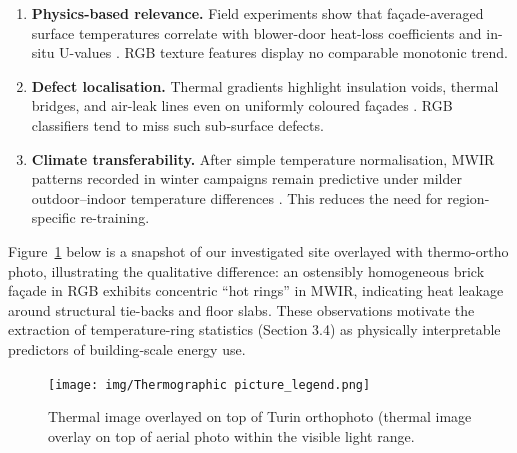 \documentclass[preprint,12pt]{elsarticle}
\begin{document}
    \begin{enumerate}%
      \item \textbf{Physics-based relevance.} Field experiments show that façade-averaged surface temperatures correlate with blower-door heat-loss coefficients and in-situ U-values \cite{Bach2020_BerlinRoofs,Rakha2015_Heliotrope}.  RGB texture features display no comparable monotonic trend.
      \item \textbf{Defect localisation.} Thermal gradients highlight insulation voids, thermal bridges, and air-leak lines even on uniformly coloured façades \cite{Soar2022_IREUI}.  RGB classifiers tend to miss such sub-surface defects.
      \item \textbf{Climate transferability.} After simple temperature normalisation, MWIR patterns recorded in winter campaigns remain predictive under milder outdoor–indoor temperature differences \cite{Maldaner2023_PassiveHouses}.  This reduces the need for region-specific re-training.
    \end{enumerate}
    
    Figure~\ref{fig:therm-ortho} below is a snapshot of our investigated site overlayed with thermo-ortho photo, illustrating the qualitative difference: an ostensibly homogeneous brick façade in RGB exhibits concentric “hot rings” in MWIR, indicating heat leakage around structural tie-backs and floor slabs.  
    These observations motivate the extraction of temperature-ring statistics (Section 3.4) as physically interpretable predictors of building‐scale energy use.

    \begin{figure}[h!]
            \centering
            \texttt{[image: img/Thermographic picture\_legend.png]}
            \caption{Thermal image overlayed on top of Turin orthophoto (thermal image overlay on top of aerial photo within the visible light range.}
            \label{fig:therm-ortho}
    \end{figure}
        
\end{document}
